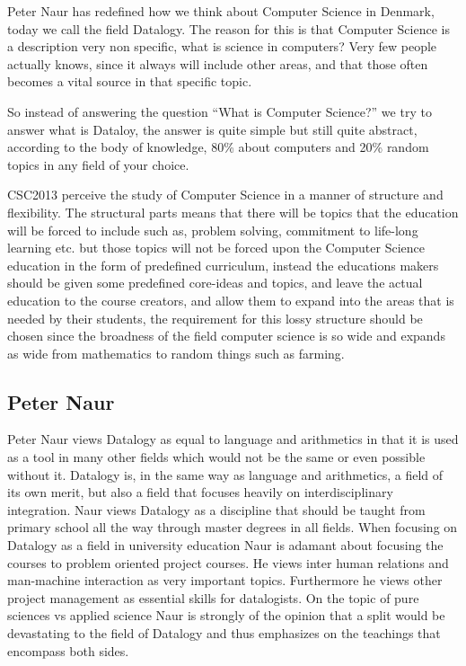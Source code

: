 \documentclass[11pt,a4paper]{article}
\theoremstyle{plain}
\theoremstyle{definition}
\theoremstyle{remark}
\numberwithin{equation}{section}
\begin{document}
Peter Naur has redefined how we think about Computer Science in Denmark, today we call the field Datalogy. The reason for this is that Computer Science is a description very non specific, what is science in computers? Very few people actually knows, since it always will include other areas, and that those often becomes a vital source in that specific topic.


So instead of answering the question ``What is Computer Science?'' we try to answer what is Dataloy, the answer is quite simple but still quite abstract, according to the body of knowledge, 80\% about computers and 20\% random topics in any field of your choice.

CSC2013 perceive the study of Computer Science in a manner of structure and flexibility.
The structural parts means that there will be topics that the education will be forced to include such as, problem solving, commitment to life-long learning etc. but those topics will not be forced upon the Computer Science education in the form of predefined curriculum, instead the educations makers should be given some predefined core-ideas and topics, and leave the actual education to the course creators, and allow them to expand into the areas that is needed by their students, the requirement for this lossy structure should be chosen since the broadness of the field computer science is so wide and expands as wide from mathematics to random things such as farming.


\subsection{Peter Naur}

Peter Naur views Datalogy as equal to language and arithmetics in that it is used as a tool in many other fields which would not be the same or even possible without it.
Datalogy is, in the same way as language and arithmetics, a field of its own merit, but also a field that focuses heavily on interdisciplinary integration.
Naur views 	Datalogy as a discipline that should be taught from primary school all the way through master degrees in all fields.
When focusing on Datalogy as a field in university education Naur is adamant about focusing the courses to problem oriented project courses. He views inter human relations and man-machine interaction as very important topics. Furthermore he views other project management as essential skills for datalogists.
On the topic of pure sciences vs applied science Naur is strongly of the opinion that a split would be devastating to the field of Datalogy and thus emphasizes on the teachings that encompass both sides. \cite{naur_datalogy}
\end{document}
